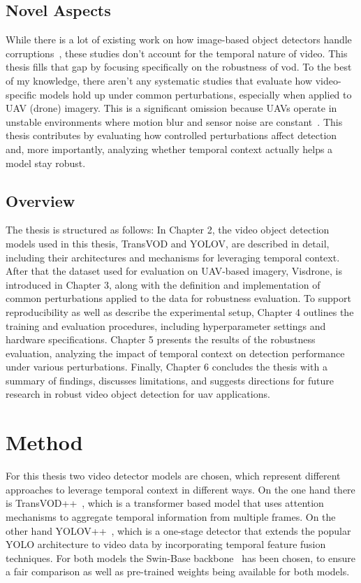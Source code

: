 \documentclass[final,twoside]{vutinfth}
\begin{document}
\section{Novel Aspects}
While there is a lot of existing work on how image-based object detectors handle corruptions~\cite{hendrycks2019benchmarking}, these studies don't account for the temporal nature of video.
This thesis fills that gap by focusing specifically on the robustness of \gls{vod}.
To the best of my knowledge, there aren't any systematic studies that evaluate how video-specific models hold up under common perturbations, especially when applied to UAV (drone) imagery.
This is a significant omission because UAVs operate in unstable environments where motion blur and sensor noise are constant~\cite{liu2024UAVRobustness}.
This thesis contributes by evaluating how controlled perturbations affect detection and, more importantly, analyzing whether temporal context actually helps a model stay robust.

\section{Overview}
The thesis is structured as follows: In Chapter 2, the video object detection models used in this thesis, TransVOD and YOLOV, are described in detail, including their architectures and mechanisms for leveraging temporal context.
After that the dataset used for evaluation on UAV-based imagery, Visdrone, is introduced in Chapter 3, along with the definition and implementation of common perturbations applied to the data for robustness evaluation.
To support reproducibility as well as describe the experimental setup, Chapter 4 outlines the training and evaluation procedures, including hyperparameter settings and hardware specifications.
Chapter 5 presents the results of the robustness evaluation, analyzing the impact of temporal context on detection performance under various perturbations.
Finally, Chapter 6 concludes the thesis with a summary of findings, discusses limitations, and suggests directions for future research in robust video object detection for \gls{uav} applications.

\chapter{Method}
For this thesis two video detector models are chosen, which represent different approaches to leverage temporal context in different ways.
On the one hand there is TransVOD++~\cite{zhou2023transvodpp}, which is a transformer based model that uses attention mechanisms to aggregate temporal information from multiple frames.
On the other hand YOLOV++~\cite{shi2024yolovpp}, which is a one-stage detector that extends the popular YOLO architecture to video data by incorporating temporal feature fusion techniques.
For both models the Swin-Base backbone~\cite{swin2021transformer} has been chosen, to ensure a fair comparison as well as pre-trained weights being available for both models.
\end{document}
